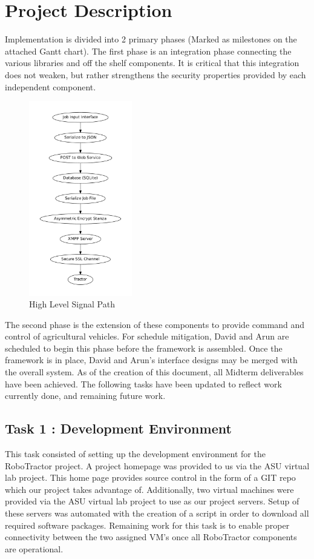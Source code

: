 \documentclass[conference,12pt]{IEEEtran}
\begin{document}
\section{Project Description}
Implementation is divided into 2 primary phases (Marked as milestones on the
attached Gantt chart).  The first phase is an integration phase connecting
the various libraries and off the shelf components. It is critical that this
integration does not weaken, but rather strengthens the security properties
provided by each independent component. 
\begin{figure}
\centering
\includegraphics[width=0.4\textwidth]{signalpath.pdf}
\caption{High Level Signal Path}
\label{fig:signalpath}
\end{figure}


The second phase is the extension of these components to provide command and
control of agricultural vehicles. For schedule mitigation, David and Arun are
scheduled to begin this phase before the framework is assembled. Once the
framework is in place, David and Arun's interface designs may be merged with the
overall system. As of the creation of this document, all Midterm deliverables have been achieved.
The following tasks have been updated to reflect work currently done, and remaining future work.

\subsection{Task 1 : Development Environment}
This task consisted of setting up the development environment for the RoboTractor project. 
A project homepage was provided to us via the ASU virtual lab project. This home page provides
source control in the form of a GIT repo which our project takes advantage of. Additionally, two
virtual machines were provided via the ASU virtual lab project to use as our project servers. Setup of
these servers was automated with the creation of a script in order to download all required software packages.
Remaining work for this task is to enable proper connectivity between the two assigned VM's once all RoboTractor components are operational.
\end{document}
